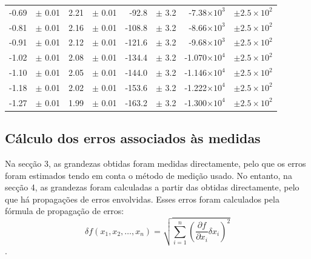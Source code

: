 \documentclass[a4paper]{article}
\begin{document}
\begin{table}[htbp]
\begin{tabular}{rlrlrlrl}
-0.69 & $\pm$ 0.01 & 2.21 & $\pm$ 0.01 & -92.8 & $\pm$ 3.2 & -7.38$\times 10^{3}$ & $\pm 2.5 \times 10^{2}$  \\ 
-0.81 & $\pm$ 0.01 & 2.16 & $\pm$ 0.01 & -108.8 & $\pm$ 3.2 & -8.66$\times 10^{3}$ & $\pm 2.5 \times 10^{2}$  \\ 
-0.91 & $\pm$ 0.01 & 2.12 & $\pm$ 0.01 & -121.6 & $\pm$ 3.2 & -9.68$\times 10^{3}$ & $\pm 2.5 \times 10^{2}$  \\ 
-1.02 & $\pm$ 0.01 & 2.08 & $\pm$ 0.01 & -134.4 & $\pm$ 3.2 & -1.070$\times 10^{4}$ & $\pm 2.5 \times 10^{2}$  \\ 
-1.10 & $\pm$ 0.01 & 2.05 & $\pm$ 0.01 & -144.0 & $\pm$ 3.2 & -1.146$\times 10^{4}$ & $\pm 2.5 \times 10^{2}$  \\ 
-1.18 & $\pm$ 0.01 & 2.02 & $\pm$ 0.01 & -153.6 & $\pm$ 3.2 & -1.222$\times 10^{4}$ & $\pm 2.5 \times 10^{2}$  \\ 
-1.27 & $\pm$ 0.01 & 1.99 & $\pm$ 0.01 & -163.2 & $\pm$ 3.2 & -1.300$\times 10^{4}$ & $\pm 2.5 \times 10^{2}$  \\ 
\hline
\end{tabular}
\label{calibracao}

\end{table}
\newpage
\subsection{Cálculo dos erros associados às medidas}
Na secção 3, as grandezas obtidas foram medidas directamente, pelo que os erros foram estimados tendo em conta o método de medição usado. No entanto, na secção 4, as grandezas foram calculadas a partir das obtidas directamente, pelo que há propagações de erros envolvidas. Esses erros foram calculados pela fórmula de propagação de erros: \begin{equation} \delta f(x_1,x_2,\ldots,x_n)=\sqrt{\sum_{i=1}^{n}\left( \frac{\partial f}{\partial x_i}\delta x_i \right)^2}\end{equation}.
\end{document}
